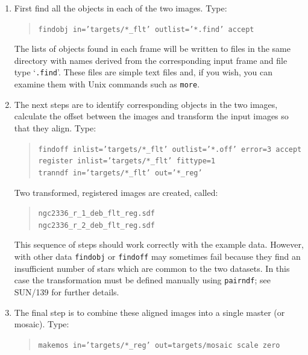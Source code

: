 \documentclass[twoside,11pt]{article}
\newcommand{\xref}[3]{#1}
\begin{document}
\begin{enumerate}

  \item First find all the objects in each of the two images.  Type:

  \begin{quote}
   {\tt findobj in='targets/*\_flt' outlist='*.find' accept}
  \end{quote}

   The lists of objects found in each frame will be written to files
   in the same directory with names derived from the corresponding input
   frame and file type `{\tt .find}'.  These files are simple text files
   and, if you wish, you can examine them with Unix commands such as
   {\tt more}.

  \item The next steps are to identify corresponding objects in the two
   images, calculate the offset between the images and transform the
   input images so that they align.  Type:

  \begin{quote}
   {\tt findoff inlist='targets/*\_flt' outlist='*.off' error=3
   accept  \\
   register inlist='targets/*\_flt' fittype=1 \\
   tranndf  in='targets/*\_flt' out='*\_reg'}
  \end{quote}

   Two transformed, registered images are created, called:

  \begin{quote}
   {\tt ngc2336\_r\_1\_deb\_flt\_reg.sdf \\
   ngc2336\_r\_2\_deb\_flt\_reg.sdf}
  \end{quote}

   This sequence of steps should work correctly with the example data.
   However, with other data {\tt findobj} or {\tt findoff} may sometimes
   fail because they find an insufficient number of stars which are common
   to the two datasets.  In this case the transformation must be defined
   manually using {\tt pairndf}; see \xref{SUN/139}{sun139}{mosaicing}
   for further details.

  \item The final step is to combine these aligned images into a single
   master (or mosaic).  Type:

  \begin{quote}
   {\tt makemos in='targets/*\_reg' out=targets/mosaic scale zero}
  \end{quote}


\end{enumerate}
\end{document}
